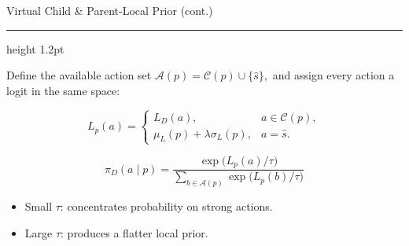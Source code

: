 \documentclass[aspectratio=169]{beamer}
\begin{document}
\begin{frame}{Virtual Child \& Parent-Local Prior (cont.)}
\vspace{-2em}
{\color{titledred}\hrule height 1.2pt}
\vspace{0.9em}

Define the available action set $  \mathcal{A}(p)
  =
  \mathcal{C}(p)\cup\{\hat{s}\},$
and assign every action a logit in the same space:
\vspace{0.2em}
{\footnotesize
\begin{equation*}
  L_p(a)
  =
  \begin{cases}
    L_D(a),
      & a\in\mathcal{C}(p),
      \\[0.4em]
    \mu_L(p)+\lambda\sigma_L(p),
      & a=\hat{s}.
  \end{cases}
\end{equation*}

\vspace{0.4em}

\begin{equation*}
  \boxed{
  \pi_D(a\mid p)
  =
  \frac{
    \exp\bigl(L_p(a)/\tau\bigr)
  }{
    \displaystyle
    \sum_{b\in\mathcal{A}(p)}
    \exp\bigl(L_p(b)/\tau\bigr)
  }
  }
\end{equation*}
}

\vspace{0.6em}

\begin{itemize}
  \item Small \(\tau\): concentrates probability on strong actions.
  \item Large \(\tau\): produces a flatter local prior.
\end{itemize}

\end{frame}
\end{document}
